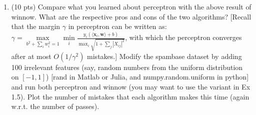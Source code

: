 \documentclass[10pt,letter,notitlepage]{article}
\newcommand{\wv}{\mathbf{w}}
\newcommand{\xv}{\mathbf{x}}
\newcommand{\inner}[2]{\langle #1, #2 \rangle}
\newcommand{\wrt}{{w.r.t.}\xspace}
\newcounter{exercise}
\begin{document}
\begin{exercise}
\begin{enumerate}
		\item (10 pts) Compare what you learned about perceptron with the above result of winnow. What are the respective pros and cons of the two algorithms? [Recall that the margin $\gamma$ in perceptron can be written as: $\gamma = \max\limits_{b^2 + \sum_i w_i^2=1} \min\limits_i \frac{y_i (\inner{\xv_i}{\wv}+b)}{\max_i\sqrt{1+\sum_j |X_{ij}|^2} }$, with which the perceptron converges after at most $O(1/\gamma^2)$ mistakes.] Modify the \textsf{spambase} dataset by adding 100 irrelevant features (say, random numbers from the uniform distribution on $[-1,1]$) [\textsf{rand} in \textsf{Matlab} or \textsf{Julia}, and \textsf{numpy.random.uniform} in \textsf{python}] and run both perceptron and winnow (you may want to use the variant in Ex 1.5). Plot the number of mistakes  that each algorithm makes this time (again \wrt the number of passes).
	\end{enumerate}
\end{exercise}
\end{document}
